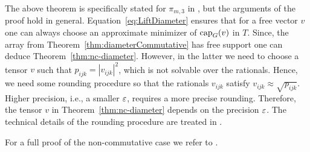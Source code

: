 The above theorem is specifically stated for $\pi_{m,3}$ in \cite{WeightMargin}, but the arguments of the proof hold in general. Equation~\eqref{eq:LiftDiameter} ensures that for a free vector $v$ one can always choose an approximate minimizer of $\operatorname{cap}_G(v)$ in $T$. Since, the array from Theorem~\ref{thm:diameterCommutative} has free support \cite[Lemma~4.21]{WeightMargin} one can deduce Theorem~\ref{thm:nc-diameter}. However, in the latter we need to choose a tensor $v$ such that $p_{ijk} = |v_{ijk}|^2$, which is not solvable over the rationals. Hence, we need some rounding procedure so that the rationals $v_{ijk}$ satisfy $v_{ijk} \approx \sqrt{p_{ijk}}$. Higher precision, i.e., a smaller $\varepsilon$, requires a more precise rounding. Therefore, the tensor $v$ in Theorem~\ref{thm:nc-diameter} depends on the precision $\varepsilon$. The technical details of the rounding procedure are treated in \cite[Lemmas~4.22 and 4~.23]{WeightMargin}.

For a full proof of the non-commutative case we refer to \cite[Section~4.5]{WeightMargin}.








